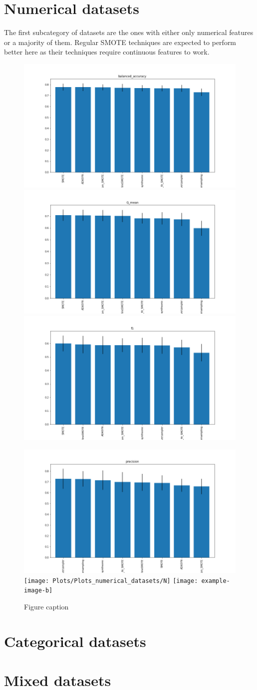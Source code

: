 \section{Numerical datasets}
The first subcategory of datasets are the ones with either only numerical features or a majority of them. Regular SMOTE techniques are expected to perform better here as their techniques require continuous features to work.

\begin{figure}[htp]
\centering
\includegraphics[width=.3\textwidth]{Plots/Plots_numerical_datasets/Numerical_balanced_accuracy.png}\quad
\includegraphics[width=.3\textwidth]{Plots/Plots_numerical_datasets/Numerical_G_mean.png}\quad
\includegraphics[width=.3\textwidth]{Plots/Plots_numerical_datasets/Numerical_f1.png}

\medskip

\includegraphics[width=.3\textwidth]{Plots/Plots_numerical_datasets/Numerical_precision.png}\quad
\texttt{[image: Plots/Plots\_numerical\_datasets/N]}\quad
\texttt{[image: example-image-b]}\quad

\caption{Figure caption}
\label{pics:blablabla}
\end{figure}


\section{Categorical datasets}

\section{Mixed datasets}




